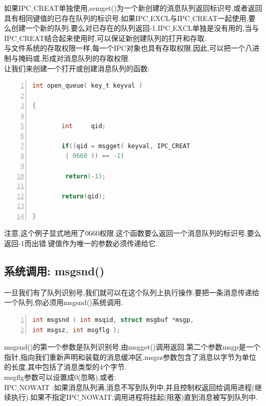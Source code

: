 \documentclass[a4paper,12pt,notitlepage]{article}
\begin{document}
	如果IPC$\_$CREAT单独使用,semget()为一个新创建的消息队列返回标识号,或者返回具有相同键值的已存在队列的标识号.如果IPC$\_$EXCL与IPC$\_$CREAT一起使用,要么创建一个新的队列,要么对已存在的队列返回-1.IPC$\_$EXCL单独是没有用的,当与IPC$\_$CREAT结合起来使用时,可以保证新创建队列的打开和存取.\\

	与文件系统的存取权限一样,每一个IPC对象也具有存取权限,因此,可以把一个八进制与掩码或,形成对消息队列的存取权限.\\

	让我们来创建一个打开或创建消息队列的函数:

\begin{lstlisting}[frame=shadowbox,numbers=left,language=C]
int open_queue( key_t keyval )

{

        int     qid;

        if((qid = msgget( keyval, IPC_CREAT
         | 0660 )) == -1)

	     return(-1);

        return(qid);

}
\end{lstlisting}

	注意,这个例子显式地用了0660权限.这个函数要么返回一个消息队列的标识号,要么返回-1而出错.键值作为唯一的参数必须传递给它.

\subsection{系统调用: msgsnd()}

	一旦我们有了队列识别号,我们就可以在这个队列上执行操作.要把一条消息传递给一个队列,你必须用msgsnd()系统调用.

\begin{lstlisting}[frame=shadowbox,numbers=left,language=C]
int msgsnd ( int msqid, struct msgbuf *msgp, 
int msgsz, int msgflg );
\end{lstlisting}

	msgsnd()的第一个参数是队列识别号,由msgget()调用返回.第二个参数msgp是一个指针,指向我们重新声明和装载的消息缓冲区.msgsz参数包含了消息以字节为单位的长度,其中包括了消息类型的4个字节.\\

	msgflg参数可以设置成0(忽略),或者: \\

	IPC$\_$NOWAIT :如果消息队列满,消息不写到队列中,并且控制权返回给调用进程(继续执行).如果不指定IPC$\_$NOWAIT,调用进程将挂起(阻塞)直到消息被写到队列中.\\
\end{document}
